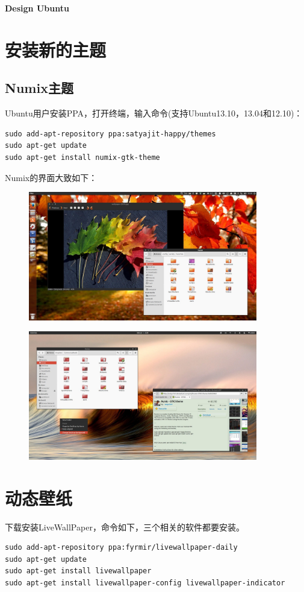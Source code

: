 \documentclass[a4paper,12pt]{ctexart}
\begin{document}
\begin{center}
\huge \textbf{Design Ubuntu}
\end{center}

\tableofcontents

\newpage
\section{安装新的主题}
\subsection{Numix主题}
Ubuntu用户安装PPA，打开终端，输入命令(支持Ubuntu13.10，13.04和12.10)：
\begin{verbatim}
sudo add-apt-repository ppa:satyajit-happy/themes
sudo apt-get update
sudo apt-get install numix-gtk-theme
\end{verbatim}
Numix的界面大致如下：
\begin{figure}[H]
  \centering
  \includegraphics[width=10cm]{Figures/Numix_theme_1.jpg}
\end{figure}

\begin{figure}[H]
  \centering
  \includegraphics[width=10cm]{Figures/Numix_theme_2.jpg}
\end{figure}


\newpage
\section{动态壁纸}
下载安装LiveWallPaper，命令如下，三个相关的软件都要安装。
\begin{verbatim}
sudo add-apt-repository ppa:fyrmir/livewallpaper-daily
sudo apt-get update
sudo apt-get install livewallpaper
sudo apt-get install livewallpaper-config livewallpaper-indicator
\end{verbatim}
\end{document}
